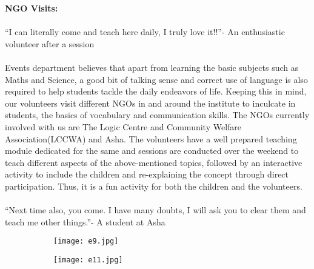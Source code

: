 
\noindent \textbf {\Large \linebreak \linebreak \linebreak \linebreak \linebreak NGO Visits:}\\ \\“I can literally come and teach here daily, I truly love it!!”- An enthusiastic volunteer after a session \\ \\
Events department believes that apart from learning the basic subjects such as Maths and Science, a good bit of talking sense and correct use of language is also required to help students tackle the daily endeavors of life. Keeping this in mind, our volunteers visit different NGOs in and around the institute to inculcate in students, the basics of vocabulary and communication skills. The NGOs currently involved with us are The Logic Centre and Community Welfare Association(LCCWA) and Asha. The volunteers have a well prepared teaching module dedicated for the same and sessions are conducted over the weekend to teach different aspects of the above-mentioned topics, followed by an interactive activity to include the children and re-explaining the concept through direct participation. Thus, it is a fun activity for both the children and the volunteers. \\ \\
“Next time also, you come. I have many doubts, I will ask you to clear them and teach me other things.”-  A student at Asha
\\

\begin{figure}[H]
\centering
\begin{subfigure}{.5\textwidth}
 \centering
 \texttt{[image: e9.jpg]}
\end{subfigure}%
\begin{subfigure}{.5\textwidth}
\texttt{[image: e11.jpg]}
\end{subfigure}
\end{figure}

